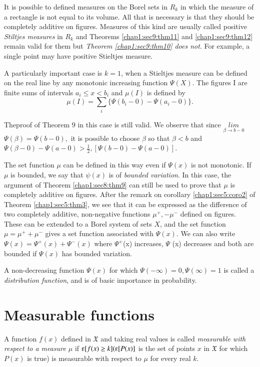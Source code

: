 It is possible to defined measures on the Borel sets in $R_k$ in
which the measure of a rectangle is not equal to its volume. All that
is necessary is that they should be completely additive on
figures. Measures of this  kind are usually called positive \textit{Stiltjes
measures} in $R_k$ and Theorems \ref{chap1:sec9:thm11} and
\ref{chap1:sec9:thm12} remain valid for them but  
\textit{Theorem \ref{chap1:sec9:thm10} 
does not}. For example, a single point may have positive Stieltjes measure.

A particularly important case is $k=1$, when a Stieltjes measure can be
defined on the real line by any monotonic increasing function
$\Psi(X)$. The figures I are finite sums of intervals  $a_i \leq x <
b_i $ and $\mu (I)$ is defined by 
$$ 
\mu (I) = \underset{i}{\sum} \{\Psi (b_i -0) - \Psi (a_i - 0)\}.
$$

The\pageoriginale proof of Theorem 9 in this case is still valid. We observe that
since $\underset{\beta \rightarrow b-0} {lim} $ 
 $\Psi (\beta)= \Psi (b-0),$ it is possible to choose $\beta $ so
that  $\beta <b $ and $\Psi (\beta-0) - \Psi (a-0)>\frac 1 2, [\Psi
  (b-0)-\Psi (a-0)]$. 

The set function $ \mu$ can be defined in this way even if $\Psi (x)$
is not monotonic. If $\mu$ is bounded, we say that $\psi(x)$ is of
\textit{bounded variation}. 
 In this case, the argument of Theorem \ref{chap1:sec8:thm9} can still be used to prove
 that $\mu $ is completely additive on figures. After the remark  on
 corollary \ref{chap1:sec5:coro2} of  
Theorem \ref{chap1:sec5:thm3}, we see that it can be expressed as the difference of two
completely additive, non-negative functions $\mu^+,-\mu^-$ defined on  
figures. These can be extended to a Borel system of sets $X$, and the
set function $\mu=\mu^++\mu^-$ gives a set function associated with
$\Psi (x)$. We can also write $\Psi (x)=\Psi^+(x)+\Psi^-(x)$ where
$\Psi^+$(x) increases, $\Psi $ (x) decreases and both are bounded if
$\Psi (x)$ has bounded variation.
 
A non-decreasing function $\Psi (x)$ for which $\Psi (-\infty)=0, \Psi
(\infty)=1$ 
 is called a \textit{distribution function}, and is of basic importance in
 probability.
 
\section {Measurable functions}\label{chap1:sec10} %
 
 A function $f(x)$ defined in $ \mathfrak{X} $ and taking real values
 is called \textit{measurable with respect to a  
 measure $\mu$} if $\varepsilonup[f(x)\geq k](\varepsilonup[P(x)]$
 is the set of points $x$ in $\mathfrak{X}$ for which $P(x)$ is true)  is
 measurable with respect to $\mu$ for every real $k$.
 

